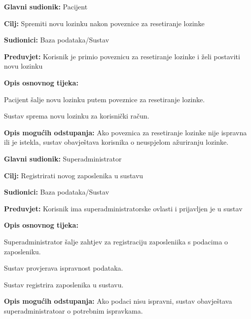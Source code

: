 \noindent {}
\begin{packed_item}
	
	\item \textbf{Glavni sudionik: }Pacijent
	\item  \textbf{Cilj:} Spremiti novu lozinku nakon poveznice za resetiranje lozinke
	\item  \textbf{Sudionici:} Baza podataka/Sustav
	\item  \textbf{Preduvjet:} Korisnik je primio poveznicu za resetiranje lozinke i želi postaviti novu lozinku
	\item  \textbf{Opis osnovnog tijeka:}
	
	\item[] \begin{packed_enum}
		
		\item Pacijent šalje novu lozinku putem poveznice za resetiranje lozinke.
		\item Sustav sprema novu lozinku za korisnički račun.
		
	\end{packed_enum}
	
	\item  \textbf{Opis mogućih odstupanja:} Ako poveznica za resetiranje lozinke nije ispravna ili je istekla, sustav obavještava korisnika o neuspjelom ažuriranju lozinke. 
	
	
\end{packed_item}

\noindent {}
\begin{packed_item}
	
	\item \textbf{Glavni sudionik: }Superadministrator
	\item  \textbf{Cilj:} Registrirati novog zaposlenika u sustavu
	\item  \textbf{Sudionici:} Baza podataka/Sustav
	\item  \textbf{Preduvjet:} Korisnik ima superadministratorske ovlasti i prijavljen je u sustav
	\item  \textbf{Opis osnovnog tijeka:}
	
	\item[] \begin{packed_enum}
		
		\item Superadministrator šalje zahtjev za registraciju zaposleniika s podacima o zaposleniku.
		\item Sustav provjerava ispravnost podataka.
		\item Sustav registrira zaposlenika u sustavu.
		
	\end{packed_enum}
	
	\item  \textbf{Opis mogućih odstupanja:} Ako podaci nisu ispravni, sustav obavještava superadministratoar o potrebnim ispravkama.
	
	
\end{packed_item}

